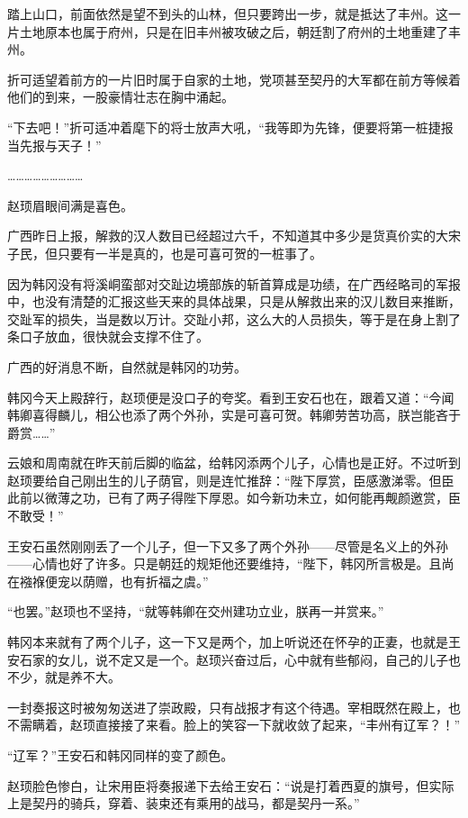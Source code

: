 踏上山口，前面依然是望不到头的山林，但只要跨出一步，就是抵达了丰州。这一片土地原本也属于府州，只是在旧丰州被攻破之后，朝廷割了府州的土地重建了丰州。

折可适望着前方的一片旧时属于自家的土地，党项甚至契丹的大军都在前方等候着他们的到来，一股豪情壮志在胸中涌起。

“下去吧！”折可适冲着麾下的将士放声大吼，“我等即为先锋，便要将第一桩捷报当先报与天子！”

………………………

赵顼眉眼间满是喜色。

广西昨日上报，解救的汉人数目已经超过六千，不知道其中多少是货真价实的大宋子民，但只要有一半是真的，也是可喜可贺的一桩事了。

因为韩冈没有将溪峒蛮部对交趾边境部族的斩首算成是功绩，在广西经略司的军报中，也没有清楚的汇报这些天来的具体战果，只是从解救出来的汉儿数目来推断，交趾军的损失，当是数以万计。交趾小邦，这么大的人员损失，等于是在身上割了条口子放血，很快就会支撑不住了。

广西的好消息不断，自然就是韩冈的功劳。

韩冈今天上殿辞行，赵顼便是没口子的夸奖。看到王安石也在，跟着又道：“今闻韩卿喜得麟儿，相公也添了两个外孙，实是可喜可贺。韩卿劳苦功高，朕岂能吝于爵赏……”

云娘和周南就在昨天前后脚的临盆，给韩冈添两个儿子，心情也是正好。不过听到赵顼要给自己刚出生的儿子荫官，则是连忙推辞：“陛下厚赏，臣感激涕零。但臣此前以微薄之功，已有了两子得陛下厚恩。如今新功未立，如何能再觍颜邀赏，臣不敢受！”

王安石虽然刚刚丢了一个儿子，但一下又多了两个外孙——尽管是名义上的外孙——心情也好了许多。只是朝廷的规矩他还要维持，“陛下，韩冈所言极是。且尚在襁褓便宠以荫赠，也有折福之虞。”

“也罢。”赵顼也不坚持，“就等韩卿在交州建功立业，朕再一并赏来。”

韩冈本来就有了两个儿子，这一下又是两个，加上听说还在怀孕的正妻，也就是王安石家的女儿，说不定又是一个。赵顼兴奋过后，心中就有些郁闷，自己的儿子也不少，就是养不大。

一封奏报这时被匆匆送进了崇政殿，只有战报才有这个待遇。宰相既然在殿上，也不需瞒着，赵顼直接接了来看。脸上的笑容一下就收敛了起来，“丰州有辽军？！”

“辽军？”王安石和韩冈同样的变了颜色。

赵顼脸色惨白，让宋用臣将奏报递下去给王安石：“说是打着西夏的旗号，但实际上是契丹的骑兵，穿着、装束还有乘用的战马，都是契丹一系。”

